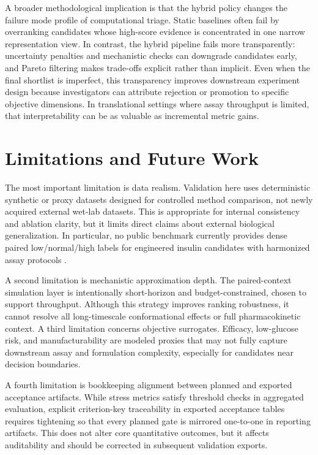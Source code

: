 \documentclass{article} %
\begin{document}
A broader methodological implication is that the hybrid policy changes the failure mode profile of computational triage. Static baselines often fail by overranking candidates whose high-score evidence is concentrated in one narrow representation view. In contrast, the hybrid pipeline fails more transparently: uncertainty penalties and mechanistic checks can downgrade candidates early, and Pareto filtering makes trade-offs explicit rather than implicit. Even when the final shortlist is imperfect, this transparency improves downstream experiment design because investigators can attribute rejection or promotion to specific objective dimensions. In translational settings where assay throughput is limited, that interpretability can be as valuable as incremental metric gains.

\section{Limitations and Future Work}
\label{sec:limitations}
The most important limitation is data realism. Validation here uses deterministic synthetic or proxy datasets designed for controlled method comparison, not newly acquired external wet-lab datasets. This is appropriate for internal consistency and ablation clarity, but it limits direct claims about external biological generalization. In particular, no public benchmark currently provides dense paired low/normal/high labels for engineered insulin candidates with harmonized assay protocols \citep{src02,src10,src11,src29,src30}.

A second limitation is mechanistic approximation depth. The paired-context simulation layer is intentionally short-horizon and budget-constrained, chosen to support throughput. Although this strategy improves ranking robustness, it cannot resolve all long-timescale conformational effects or full pharmacokinetic context. A third limitation concerns objective surrogates. Efficacy, low-glucose risk, and manufacturability are modeled proxies that may not fully capture downstream assay and formulation complexity, especially for candidates near decision boundaries.

A fourth limitation is bookkeeping alignment between planned and exported acceptance artifacts. While stress metrics satisfy threshold checks in aggregated evaluation, explicit criterion-key traceability in exported acceptance tables requires tightening so that every planned gate is mirrored one-to-one in reporting artifacts. This does not alter core quantitative outcomes, but it affects auditability and should be corrected in subsequent validation exports.
\end{document}
